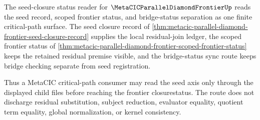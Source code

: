 The seed-closure status reader for $\MetaCICParallelDiamondFrontierUp$ reads the seed record, scoped frontier status, and bridge-status separation as one finite critical-path surface. The seed closure record of \autoref{thm:metacic-parallel-diamond-frontier-seed-closure-record} supplies the local residual-join ledger, the scoped frontier status of \autoref{thm:metacic-parallel-diamond-frontier-scoped-frontier-status} keeps the retained residual premise visible, and the bridge-status sync route keeps bridge checking separate from seed registration.

Thus a MetaCIC critical-path consumer may read the seed axis only through the displayed child files before reaching the frontier closurestatus. The route does not discharge residual substitution, subject reduction, evaluator equality, quotient term equality, global normalization, or kernel consistency.
